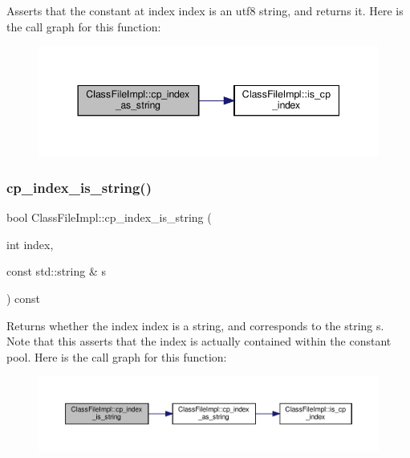 Asserts that the constant at index {\ttfamily index} is an utf8 string, and returns it. Here is the call graph for this function\+:\nopagebreak
\begin{figure}[H]
\begin{center}
\leavevmode
\includegraphics[width=344pt]{classClassFileImpl_abf8923075c93d6d5bd1755a7b3ced362_cgraph}
\end{center}
\end{figure}
\mbox{\label{classClassFileImpl_ab84cd50d25d163274a299ba682f57610}} 
\subsubsection{\texorpdfstring{cp\+\_\+index\+\_\+is\+\_\+string()}{cp\_index\_is\_string()}}
{\footnotesize\ttfamily bool Class\+File\+Impl\+::cp\+\_\+index\+\_\+is\+\_\+string (\begin{DoxyParamCaption}\item[{int}]{index,  }\item[{const std\+::string \&}]{s }\end{DoxyParamCaption}) const}

Returns whether the index {\ttfamily index} is a string, and corresponds to the string {\ttfamily s}. Note that this asserts that the index is actually contained within the constant pool. Here is the call graph for this function\+:\nopagebreak
\begin{figure}[H]
\begin{center}
\leavevmode
\includegraphics[width=350pt]{classClassFileImpl_ab84cd50d25d163274a299ba682f57610_cgraph}
\end{center}
\end{figure}
\mbox{\label{classClassFileImpl_abdfa46cef80b0ec30115f1c0c9bb1db6}} 
